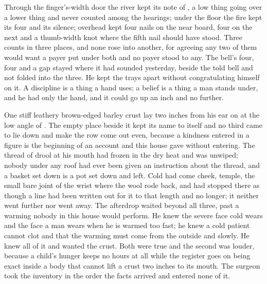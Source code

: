 Through the finger's-width door the river kept its note of , a low thing going over a lower thing and never counted among the hearings; under the floor the fire kept its four and its silence; overhead  kept four nails on the near board, four on the next and a thumb-width knot where the fifth nail should have stood. Three counts in three places, and none rose into another, for agreeing any two of them would want a payer put under both and no payer stood to any. The bell's four, four and a gap stayed where it had sounded yesterday, beside the told bell and not folded into the three. He kept the trays apart without congratulating himself on it. A discipline is a thing a hand uses; a belief is a thing a man stands under, and he had only the hand, and it could go up an inch and no further.

One stiff leathery brown-edged barley crust lay two inches from his ear on  at the low angle of . The empty place beside it kept its name to itself and no third came to lie down and make the row come out even, because a kindness entered in a figure is the beginning of an account and this house gave without entering. The thread of drool at his mouth had frozen in the dry heat and was unwiped; nobody under any roof had ever been given an instruction about the thread, and a basket set down is a pot set down and left. Cold had come cheek, temple, the small bare joint of the wrist where the wool rode back, and had stopped there as though a line had been written out for it to that length and no longer; it neither went further nor went away. The afterdrop waited beyond all three, past a warming nobody in this house would perform. He knew the severe face cold wears and the face a man wears when he is warmed too fast; he knew a cold patient cannot clot and that the warming must come from the outside and slowly. He knew all of it and wanted the crust. Both were true and the second was louder, because a child's hunger keeps no hours at all while the register goes on being exact inside a body that cannot lift a crust two inches to its mouth. The surgeon took the inventory in the order the facts arrived and entered none of it.

